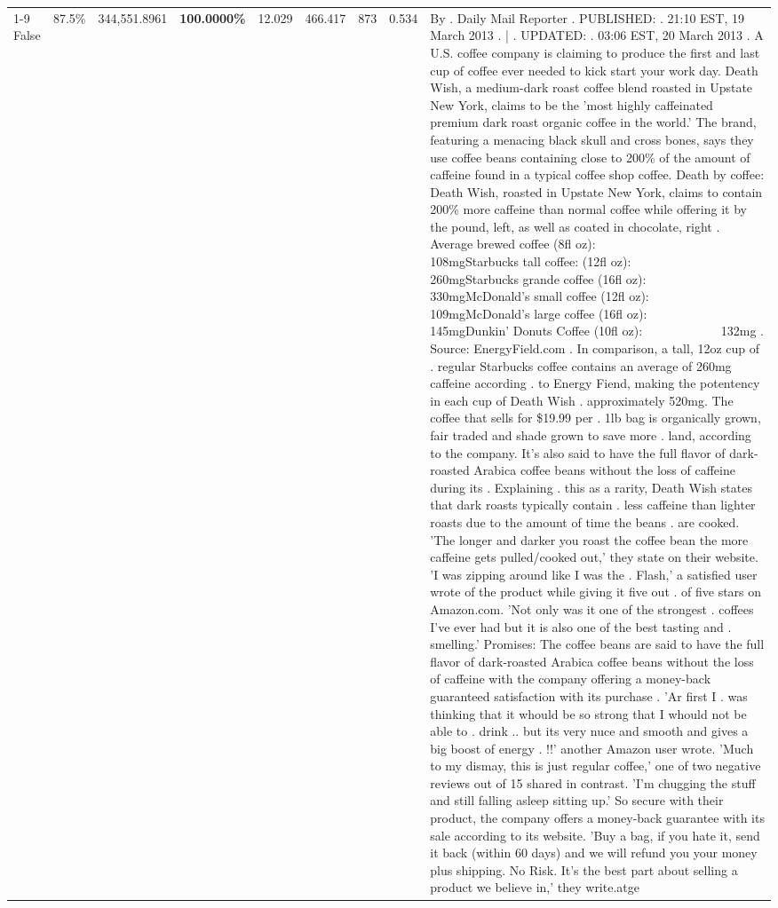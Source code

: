 \begin{table}[H]
{\begin{tabular}{lllrlllll}
\cline{1-9}
False & 87.5\% & 344,551.8961 & \bfseries \color{red} 100.0000\% & 12.029 & 466.417 & 873 & 0.534 & By . Daily Mail Reporter . PUBLISHED: . 21:10 EST, 19 March 2013 . | . UPDATED: . 03:06 EST, 20 March 2013 . A U.S. coffee company is claiming to produce the first and last cup of coffee ever needed to kick start your work day. Death Wish, a medium-dark roast coffee blend roasted in Upstate New York, claims to be the 'most highly caffeinated premium dark roast organic coffee in the world.' The brand, featuring a menacing black skull and cross bones, says they use coffee beans containing close to 200\% of the amount of caffeine found in a typical coffee shop coffee. Death by coffee: Death Wish, roasted in Upstate New York, claims to contain 200\% more caffeine than normal coffee while offering it by the pound, left, as well as coated in chocolate, right . Average brewed coffee (8fl oz):              108mgStarbucks tall coffee: (12fl oz):                260mgStarbucks grande coffee (16fl oz):         330mgMcDonald's small coffee (12fl oz):           109mgMcDonald's large coffee (16fl oz):           145mgDunkin' Donuts Coffee (10fl oz):             132mg . Source: EnergyField.com . In comparison, a tall, 12oz cup of . regular Starbucks coffee contains an average of 260mg caffeine according . to Energy Fiend, making the potentency in each cup of Death Wish . approximately 520mg. The coffee that sells for \$19.99 per . 1lb bag is organically grown, fair traded and shade grown to save more . land, according to the company. It's also said to have the full flavor of dark-roasted Arabica coffee beans without the loss of caffeine during its . Explaining . this as a rarity, Death Wish states that dark roasts typically contain . less caffeine than lighter roasts due to the amount of time the beans . are cooked. 'The longer and darker you roast the coffee bean the more caffeine gets pulled/cooked out,' they state on their website. 'I was zipping around like I was the . Flash,' a satisfied user wrote of the product while giving it five out . of five stars on Amazon.com. 'Not only was it one of the strongest . coffees I've ever had but it is also one of the best tasting and . smelling.’ Promises: The coffee beans are said to have the full flavor of dark-roasted Arabica coffee beans without the loss of caffeine with the company offering a money-back guaranteed satisfaction with its purchase . 'Ar first I . was thinking that it whould be so strong that I whould not be able to . drink .. but its very nuce and smooth and gives a big boost of energy . !!' another Amazon user wrote. 'Much to my dismay, this is just regular coffee,' one of two negative reviews out of 15 shared in contrast. 'I'm chugging the stuff and still falling asleep sitting up.' So secure with their product, the company offers a money-back guarantee with its sale according to its website. 'Buy a bag, if you hate it, send it back (within 60 days) and we will refund you your money plus shipping. No Risk. It’s the best part about selling a product we believe in,' they write.atge \\

\end{tabular}}
\end{table}
